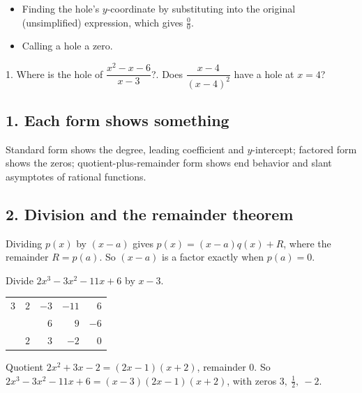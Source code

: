 \begin{mistakes}
\begin{itemize}
\item Finding the hole's $y$-coordinate by substituting into the original (unsimplified) expression, which gives $\frac00$.
\item Calling a hole a zero.
\end{itemize}
\end{mistakes}

\begin{quickcheck}
1. Where is the hole of $\dfrac{x^2-x-6}{x-3}$?. Does $\dfrac{x-4}{(x-4)^2}$ have a hole at $x=4$?
\end{quickcheck}


\subsection*{1. Each form shows something}
Standard form shows the degree, leading coefficient and $y$-intercept; factored form shows the zeros; quotient-plus-remainder form shows end behavior and slant asymptotes of rational functions.

\subsection*{2. Division and the remainder theorem}
\begin{keyidea}
Dividing $p(x)$ by $(x-a)$ gives $p(x)=(x-a)q(x)+R$, where the remainder $R=p(a)$. So $(x-a)$ is a factor exactly when $p(a)=0$.
\end{keyidea}

\begin{example}
Divide $2x^3-3x^2-11x+6$ by $x-3$.
\begin{center}
\begin{tabular}{r|rrrr}
$3$ & $2$ & $-3$ & $-11$ & $6$\\
 & & $6$ & $9$ & $-6$\\\hline
 & $2$ & $3$ & $-2$ & $0$
\end{tabular}
\end{center}
\sol Quotient $2x^2+3x-2=(2x-1)(x+2)$, remainder $0$. So $2x^3-3x^2-11x+6=(x-3)(2x-1)(x+2)$, with zeros $3,\ \frac12,\ -2$.
\end{example}

